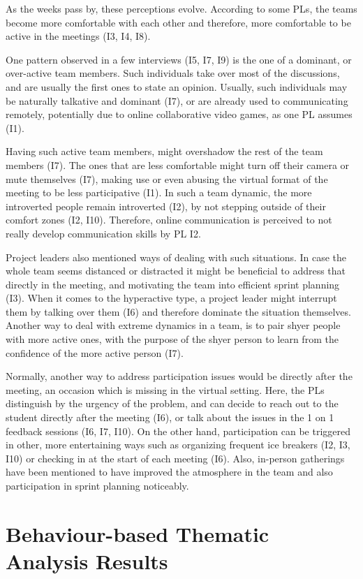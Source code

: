 As the weeks pass by, these perceptions evolve. According to some PLs, the teams become more comfortable with each other and therefore, more comfortable to be active in the meetings (I3, I4, I8). 

One pattern observed in a few interviews (I5, I7, I9) is the one of a dominant, or over-active team members. Such individuals take over most of the discussions, and are usually the first ones to state an opinion. Usually, such individuals may be naturally talkative and dominant (I7), or are already used to communicating remotely, potentially due to online collaborative video games, as one PL assumes (I1). 

Having such active team members, might overshadow the rest of the team members (I7). The ones that are less comfortable might turn off their camera or mute themselves (I7), making use or even abusing the virtual format of the meeting to be less participative (I1). In such a team dynamic, the more introverted people remain introverted (I2), by not stepping outside of their comfort zones (I2, I10). Therefore, online communication is perceived to not really develop communication skills by PL I2.

Project leaders also mentioned ways of dealing with such situations. In case the whole team seems distanced or distracted it might be beneficial to address that directly in the meeting, and motivating the team into efficient sprint planning (I3). When it comes to the hyperactive type, a project leader might interrupt them by talking over them (I6) and therefore dominate the situation themselves. Another way to deal with extreme dynamics in a team, is to pair shyer people with more active ones, with the purpose of the shyer person to learn from the confidence of the more active person (I7). 

Normally, another way to address participation issues would be directly after the meeting, an occasion which is missing in the virtual setting. Here, the PLs distinguish by the urgency of the problem, and can decide to reach out to the student directly after the meeting (I6), or talk about the issues in the 1 on 1 feedback sessions (I6, I7, I10). On the other hand, participation can be triggered in other, more entertaining ways such as organizing frequent ice breakers (I2, I3, I10) or checking in at the start of each meeting (I6). Also, in-person gatherings have been mentioned to have improved the atmosphere in the team and also participation in sprint planning noticeably. 


\section{Behaviour-based Thematic Analysis Results}\label{Behaviours}

